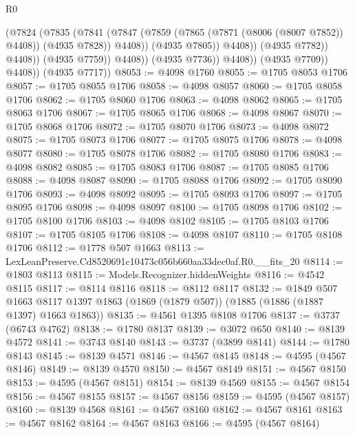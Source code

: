 \begin{lexlean}{R0}
\begin{coremodule}
                                (@7824
                                  (@7835
                                    (@7841
                                      (@7847
                                        (@7859
                                          (@7865 (@7871 (@8006 (@8007 @7852)) @4408))
                                          (@4935 @7828))
                                        @4408))
                                    (@4935 @7805))
                                  @4408))
                              (@4935 @7782))
                            @4408))
                        (@4935 @7759))
                      @4408))
                  (@4935 @7736))
                @4408))
            (@4935 @7709))
          @4408))
      (@4935 @7717))
@8053 := @4098 @1760
@8055 := @1705 @8053 @1706
@8057 := @1705 @8055 @1706
@8058 := @4098 @8057
@8060 := @1705 @8058 @1706
@8062 := @1705 @8060 @1706
@8063 := @4098 @8062
@8065 := @1705 @8063 @1706
@8067 := @1705 @8065 @1706
@8068 := @4098 @8067
@8070 := @1705 @8068 @1706
@8072 := @1705 @8070 @1706
@8073 := @4098 @8072
@8075 := @1705 @8073 @1706
@8077 := @1705 @8075 @1706
@8078 := @4098 @8077
@8080 := @1705 @8078 @1706
@8082 := @1705 @8080 @1706
@8083 := @4098 @8082
@8085 := @1705 @8083 @1706
@8087 := @1705 @8085 @1706
@8088 := @4098 @8087
@8090 := @1705 @8088 @1706
@8092 := @1705 @8090 @1706
@8093 := @4098 @8092
@8095 := @1705 @8093 @1706
@8097 := @1705 @8095 @1706
@8098 := @4098 @8097
@8100 := @1705 @8098 @1706
@8102 := @1705 @8100 @1706
@8103 := @4098 @8102
@8105 := @1705 @8103 @1706
@8107 := @1705 @8105 @1706
@8108 := @4098 @8107
@8110 := @1705 @8108 @1706
@8112 := @1778 @507 @1663
@8113 := LexLeanPreserve.Cd8520691c10473c056b660aa33dec0af.R0.__fits_20
@8114 := @1803 @8113
@8115 := Models.Recognizer.hiddenWeights
@8116 := @4542 @8115
@8117 := @8114 @8116
@8118 := @8112 @8117
@8132 := @1849
    @507
    @1663
    @8117
    @1397
    @1863
    (@1869 (@1879 @507))
    (@1885 (@1886 (@1887 @1397) @1663 @1863))
@8135 := @4561 @1395 @8108 @1706
@8137 := @3737 (@6743 @4762)
@8138 := @1780 @8137
@8139 := @3072 @650
@8140 := @8139 @4572
@8141 := @3743 @8140
@8143 := @3737 (@3899 @8141)
@8144 := @1780 @8143
@8145 := @8139 @4571
@8146 := @4567 @8145
@8148 := @4595 (@4567 @8146)
@8149 := @8139 @4570
@8150 := @4567 @8149
@8151 := @4567 @8150
@8153 := @4595 (@4567 @8151)
@8154 := @8139 @4569
@8155 := @4567 @8154
@8156 := @4567 @8155
@8157 := @4567 @8156
@8159 := @4595 (@4567 @8157)
@8160 := @8139 @4568
@8161 := @4567 @8160
@8162 := @4567 @8161
@8163 := @4567 @8162
@8164 := @4567 @8163
@8166 := @4595 (@4567 @8164)

\end{coremodule}
\end{lexlean}
